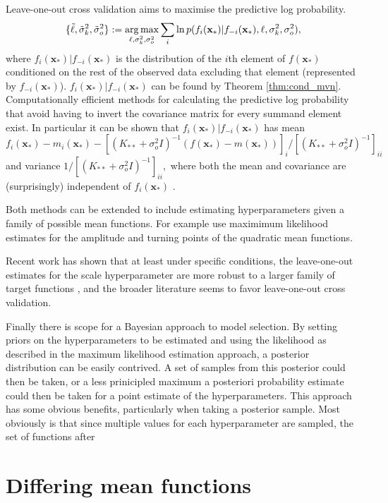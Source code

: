 Leave-one-out cross validation aims to maximise the predictive log
probability.
$$
    \{\tilde{\ell}, \tilde{\sigma}^2_k, \tilde{\sigma}^2_o\}
    := \operatorname*{arg\,max}_{\ell, \sigma^2_k, \sigma^2_o} \sum_{i}
    \ln p(f_i(\mathbf{x}_*) | f_{-i}(\mathbf{x}_*), \ell, \sigma^2_k, \sigma^2_o),
$$ where $f_i(\mathbf{x}_*) | f_{-i}(\mathbf{x}_*)$ is the distribution of the
$i$th element of $f(\mathbf{x}_*)$ conditioned on the rest of the
observed data excluding that element (represented by $f_{-i}(\mathbf{x}_*)$).
$f_i(\mathbf{x}_*) | f_{-i}(\mathbf{x}_*)$ can be found by
Theorem \ref{thm:cond_mvn}. Computationally efficient methods for calculating
the predictive log probability that avoid having to invert the covariance
matrix for every summand element exist. In particular it can be shown that
$f_i(\mathbf{x}_*) | f_{-i}(\mathbf{x}_*)$ has mean
$$
    f_i(\mathbf{x}_*) - m_i(\mathbf{x}_*)
    - [(K_{**} + \sigma^2_o I)^{-1}(f(\mathbf{x}_*) - m(\mathbf{x}_*))]_i
    /[(K_{**} + \sigma^2_o I)^{-1}]_{ii}
$$
and variance $1/[(K_{**} + \sigma^2_o I)^{-1}]_{ii},$ where both the mean and
covariance are (surprisingly) independent of $f_i(\mathbf{x}_*)$
\parencite[116]{rasmussen_gaussian_2008}.

Both methods can be extended to include estimating hyperparameters given a family
of possible mean functions. For example \cite{gutmann_bayesian_2016} use
maximimum likelihood estimates for the amplitude and turning points of the
quadratic mean functions.

Recent work has shown that at least under specific conditions, the
leave-one-out estimates for the scale hyperparameter are more robust to a larger
family of target functions \parencite{naslidnyk_comparing_2024}, and the
broader literature seems to favor leave-one-out cross validation.

Finally there is scope for a Bayesian approach to model selection. By setting
priors on the hyperparameters to be estimated and using the likelihood as described
in the maximum likelihood estimation approach, a posterior distribution can be
easily contrived. A set of samples from this posterior could then be taken, or
a less prinicipled maximum a posteriori probability
estimate could then be taken for a point estimate of the hyperparameters. This
approach has some obvious benefits, particularly when taking a posterior
sample. Most obviously is that since multiple values for each hyperparameter are
sampled, the set of functions after

\section{Differing mean functions}


